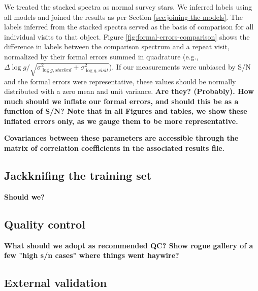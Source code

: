 \documentclass[preprint,trackchanges]{aastex}
\newcommand{\stub}[1]{{\color{blue} \textbf{#1}}}
\newcommand{\logg}{\log g}
\begin{document}
We treated the stacked spectra as normal survey stars.  We inferred labels
using all models and joined the results as per Section \ref{sec:joining-the-models}.  The labels inferred from the stacked spectra served as the basis
of comparison for all individual visits to that object.  Figure 
\ref{fig:formal-errors-comparison} shows the difference in labels 
between the comparison spectrum and a repeat visit, normalized by their 
formal errors summed in quadrature (e.g., 
$\Delta\logg/\sqrt{\sigma_{\logg,stacked}^2 + \sigma_{\logg,visit}^2}$).
If our measurements were unbiased by S/N and the formal errors were 
representative, these values should be normally distributed with a zero 
mean and unit variance.
\stub{Are they? (Probably). How much should we inflate our formal errors, and should this be as a function of S/N? Note that in all Figures and tables,
we show these inflated errors only, as we gauge them to be more representative.}

\stub{Covariances between these parameters are accessible through the matrix of correlation coefficients in the associated results file.}


\subsection{Jackknifing the training set}
\label{sec:jackknife}

\stub{Should we?}

\subsection{Quality control}
\stub{What should we adopt as recommended QC? Show rogue gallery of a few "high s/n cases" where things went haywire?}


\subsection{External validation}
\label{sec:external-validation}
\end{document}
